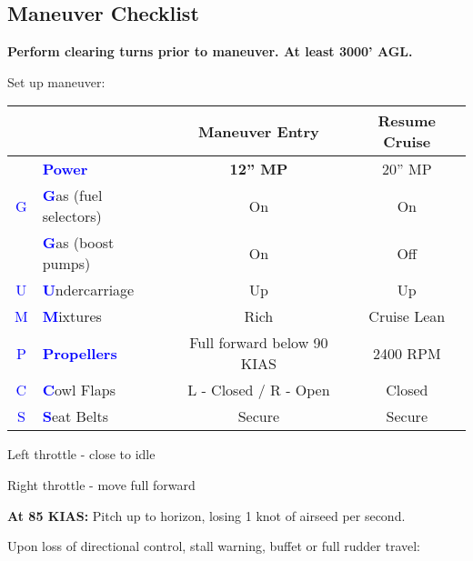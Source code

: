 {\subsection{Maneuver Checklist}

\textbf{Perform clearing turns prior to maneuver. At least 3000' AGL.}

Set up maneuver:

\begin{table}[H]
\centering
\begin{tabular}{|c|l|c|c|}
\hline
                    &                                                 & \textbf{Maneuver Entry} & \textbf{Resume Cruise} \\ \hline
                    & \textcolor{blue}{\textbf{Power}}                & \textbf{12'' MP}        & 20'' MP                \\ \hline
\textcolor{blue}{G} & \textcolor{blue}{\textbf{G}}as (fuel selectors) & On                      & On                     \\
                    & \textcolor{blue}{\textbf{G}}as (boost pumps)    & On                      & Off                    \\ \hline
\textcolor{blue}{U} & \textcolor{blue}{\textbf{U}}ndercarriage        & Up                      & Up                     \\ \hline
\textcolor{blue}{M} & \textcolor{blue}{\textbf{M}}ixtures             & Rich                    & Cruise Lean            \\ \hline
\textcolor{blue}{P} & \textcolor{blue}{\textbf{Propellers}}           & Full forward below 90 KIAS & 2400 RPM            \\ \hline
\textcolor{blue}{C} & \textcolor{blue}{\textbf{C}}owl Flaps           & L - Closed / R - Open   & Closed                 \\ \hline
\textcolor{blue}{S} & \textcolor{blue}{\textbf{S}}eat Belts           & Secure                  & Secure                 \\ \hline
\end{tabular}
\end{table}

Left throttle - close to idle

Right throttle - move full forward

\textbf{At 85 KIAS:} Pitch up to horizon, losing 1 knot of airseed per second.

Upon loss of directional control, stall warning, buffet or full rudder travel:

}
